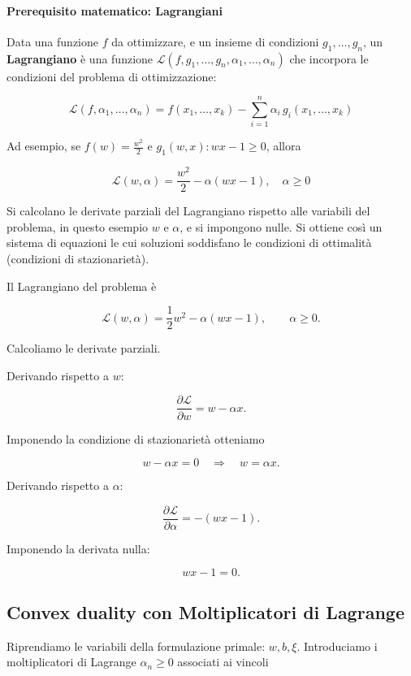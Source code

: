 \paragraph{Prerequisito matematico: Lagrangiani}
Data una funzione $f$ da ottimizzare, e un insieme di condizioni $g_1, \dots, g_n$, un \textbf{Lagrangiano} è una funzione $\mathcal{L}(f,g_1, \dots, g_n, \alpha_1, \dots, \alpha_n)$ che incorpora le condizioni del problema di ottimizzazione:

$$
\mathcal{L}(f,\alpha_1,\ldots,\alpha_n)
= f(x_1,\ldots,x_k) - \sum_{i=1}^{n} \alpha_i\, g_i(x_1,\ldots,x_k)
$$

Ad esempio, se $f(w) = \displaystyle\frac{w^2}{2}$ e $\displaystyle g_1(w,x) : wx-1 \geq 0$, allora

$$
\mathcal{L}(w,\alpha) = \frac{w^2}{2} - \alpha(wx-1), \quad \alpha \geq 0
$$

Si calcolano le derivate parziali del Lagrangiano rispetto alle variabili
del problema, in questo esempio $w$ e $\alpha$, e si impongono nulle.
Si ottiene così un sistema di equazioni le cui soluzioni soddisfano
le condizioni di ottimalità (condizioni di stazionarietà).

Il Lagrangiano del problema è

$$
\mathcal{L}(w,\alpha)
=
\frac{1}{2} w^{2}
-
\alpha (wx - 1),
\qquad
\alpha \ge 0.
$$

Calcoliamo le derivate parziali.

Derivando rispetto a $w$:

$$
\frac{\partial \mathcal{L}}{\partial w}
=
w - \alpha x.
$$

Imponendo la condizione di stazionarietà otteniamo

$$
w - \alpha x = 0
\quad \Rightarrow \quad
w = \alpha x.
$$

Derivando rispetto a $\alpha$:

$$
\frac{\partial \mathcal{L}}{\partial \alpha}
=
-(wx - 1).
$$

Imponendo la derivata nulla:

$$
wx - 1 = 0.
$$

\subsection{Convex duality con Moltiplicatori di Lagrange}

Riprendiamo le variabili della formulazione primale: $w, b, \xi$.
Introduciamo i moltiplicatori di Lagrange $\alpha_n \ge 0$
associati ai vincoli

